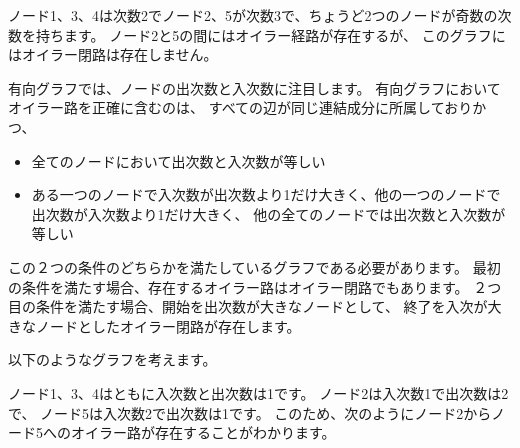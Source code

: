ノード1、3、4は次数2でノード2、5が次数3で、ちょうど2つのノードが奇数の次数を持ちます。
ノード2と5の間にはオイラー経路が存在するが、
このグラフにはオイラー閉路は存在しません。

有向グラフでは、ノードの出次数と入次数に注目します。
有向グラフにおいてオイラー路を正確に含むのは、
すべての辺が同じ連結成分に所属しておりかつ、

\begin{itemize}
\item 全てのノードにおいて出次数と入次数が等しい
\item ある一つのノードで入次数が出次数より1だけ大きく、他の一つのノードで出次数が入次数より1だけ大きく、
他の全てのノードでは出次数と入次数が等しい
\end{itemize}

この２つの条件のどちらかを満たしているグラフである必要があります。
最初の条件を満たす場合、存在するオイラー路はオイラー閉路でもあります。
２つ目の条件を満たす場合、開始を出次数が大きなノードとして、
終了を入次が大きなノードとしたオイラー閉路が存在します。

以下のようなグラフを考えます。
\begin{center}
\end{center}

ノード1、3、4はともに入次数と出次数は1です。
ノード2は入次数1で出次数は2で、
ノード5は入次数2で出次数は1です。
このため、次のようにノード2からノード5へのオイラー路が存在することがわかります。

